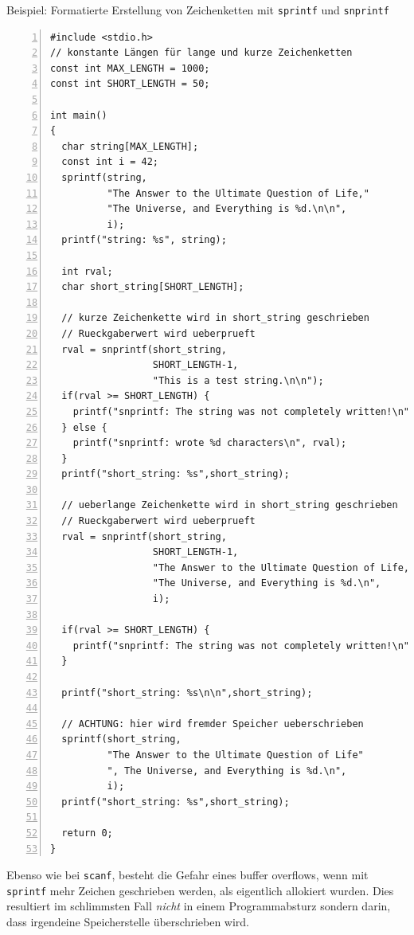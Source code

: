 \begin{myexampleprogram}{Beispiel: Formatierte Erstellung von Zeichenketten mit \texttt{sprintf} und \texttt{snprintf}}
\begin{lstlisting}[numbers=left]
#include <stdio.h>
// konstante Längen für lange und kurze Zeichenketten
const int MAX_LENGTH = 1000;
const int SHORT_LENGTH = 50;

int main()
{
  char string[MAX_LENGTH];
  const int i = 42;
  sprintf(string,
          "The Answer to the Ultimate Question of Life,"
          "The Universe, and Everything is %d.\n\n",
          i);
  printf("string: %s", string);
  
  int rval;
  char short_string[SHORT_LENGTH];
  
  // kurze Zeichenkette wird in short_string geschrieben
  // Rueckgaberwert wird ueberprueft
  rval = snprintf(short_string, 
                  SHORT_LENGTH-1, 
                  "This is a test string.\n\n");
  if(rval >= SHORT_LENGTH) {
    printf("snprintf: The string was not completely written!\n");
  } else {
    printf("snprintf: wrote %d characters\n", rval);
  }
  printf("short_string: %s",short_string);
  
  // ueberlange Zeichenkette wird in short_string geschrieben
  // Rueckgaberwert wird ueberprueft
  rval = snprintf(short_string, 
                  SHORT_LENGTH-1, 
                  "The Answer to the Ultimate Question of Life, "
                  "The Universe, and Everything is %d.\n", 
                  i);
                  
  if(rval >= SHORT_LENGTH) {
    printf("snprintf: The string was not completely written!\n");
  }
  
  printf("short_string: %s\n\n",short_string);
  
  // ACHTUNG: hier wird fremder Speicher ueberschrieben 
  sprintf(short_string, 
          "The Answer to the Ultimate Question of Life"
          ", The Universe, and Everything is %d.\n",
          i);
  printf("short_string: %s",short_string); 
  
  return 0;
}
\end{lstlisting}
\end{myexampleprogram}
Ebenso wie bei \texttt{scanf}, besteht die Gefahr eines buffer overflows, wenn mit \texttt{sprintf} mehr Zeichen geschrieben werden, als eigentlich allokiert wurden.
Dies resultiert im schlimmsten Fall \emph{nicht} in einem Programmabsturz sondern darin, dass irgendeine Speicherstelle überschrieben wird.

